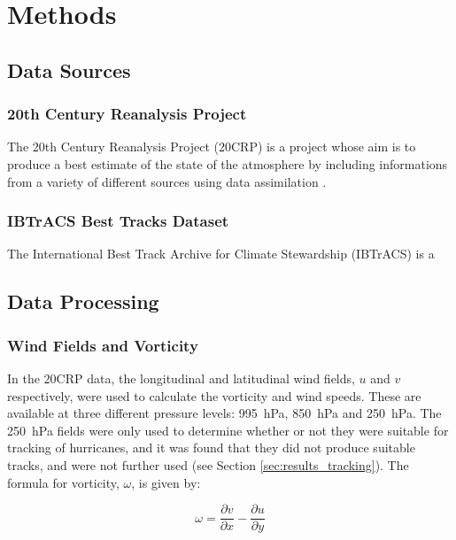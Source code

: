 \documentclass[pdftex,12pt,a4paper]{report}
\begin{document}
\chapter{Methods}

\section{Data Sources}

\subsection{20th Century Reanalysis Project}
The 20th Century Reanalysis Project (20CRP) is a project whose aim is to produce a best estimate of the state of the atmosphere by including informations from a variety of different sources using data assimilation \parencite{compoTwentieth2011}.

\subsection{IBTrACS Best Tracks Dataset}
The International Best Track Archive for Climate Stewardship (IBTrACS) \parencite{knappInternational2010} is a 

\section{Data Processing}

\subsection{Wind Fields and Vorticity}

In the 20CRP data, the longitudinal and latitudinal wind fields, $u$ and $v$ respectively, were used to calculate the vorticity and wind speeds. These are available at three different pressure levels: \SI{995}{hPa}, \SI{850}{hPa} and \SI{250}{hPa}. The \SI{250}{hPa} fields were only used to determine whether or not they were suitable for tracking of hurricanes, and it was found that they did not produce suitable tracks, and were not further used (see Section \ref{sec:results_tracking}). The formula for vorticity, $\omega$, is given by:

\begin{equation}
    \omega = \frac{\partial v}{\partial x} - \frac{\partial u}{\partial y}
    \label{eqn:vorticity}
\end{equation}
\end{document}
